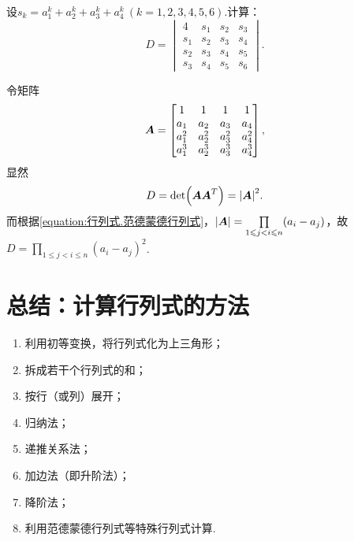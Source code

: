 \begin{example}
设\(s_k = a_1^k + a_2^k + a_3^k + a_4^k\ (k=1,2,3,4,5,6)\).计算：\[
D = \begin{vmatrix}
4 & s_1 & s_2 & s_3 \\
s_1 & s_2 & s_3 & s_4 \\
s_2 & s_3 & s_4 & s_5 \\
s_3 & s_4 & s_5 & s_6
\end{vmatrix}.
\]
\begin{solution}
令矩阵\[
\boldsymbol{A} = \begin{bmatrix}
1 & 1 & 1 & 1 \\
a_1 & a_2 & a_3 & a_4 \\
a_1^2 & a_2^2 & a_3^2 & a_4^2 \\
a_1^3 & a_2^3 & a_3^3 & a_4^3
\end{bmatrix},
\]显然\[
D = \det(\boldsymbol{A}\boldsymbol{A}^T) = \abs{\boldsymbol{A}}^2.
\]而根据\cref{equation:行列式.范德蒙德行列式}，\(\abs{\boldsymbol{A}} = \prod\limits_{1 \leqslant j < i \leqslant n} (a_i - a_j)\)，故\(D = \prod\limits_{1 \leqslant j < i \leqslant n} (a_i - a_j)^2\).
\end{solution}
\end{example}

\section{总结：计算行列式的方法}
\begin{enumerate}
\item 利用初等变换，将行列式化为上三角形；
\item 拆成若干个行列式的和；
\item 按行（或列）展开；
\item 归纳法；
\item 递推关系法；
\item 加边法（即升阶法）；
\item 降阶法；
\item 利用范德蒙德行列式等特殊行列式计算.
\end{enumerate}
